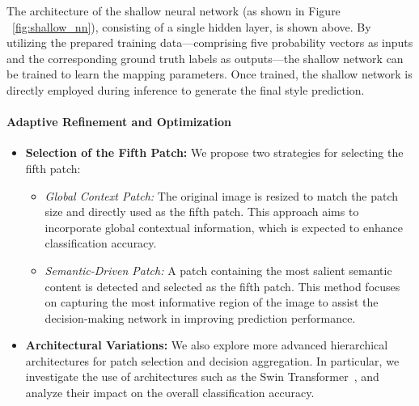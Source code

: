 The architecture of the shallow neural network (as shown in Figure ~\ref{fig:shallow_nn}), consisting of a single hidden
layer, is shown above. By utilizing the prepared training data—comprising five
probability vectors as inputs and the corresponding ground truth labels as
outputs—the shallow network can be trained to learn the mapping parameters.
Once trained, the shallow network is directly employed during inference to
generate the final style prediction.
\paragraph{Adaptive Refinement and Optimization}
\begin{itemize} \item \textbf{Selection of the Fifth Patch:}
          We propose two strategies for selecting the fifth patch: \begin{itemize} \item \textit{Global Context Patch:} The original image is resized to match the patch size and directly used as the fifth patch. This approach aims to incorporate global contextual information, which is expected to enhance classification accuracy. \item \textit{Semantic-Driven Patch:} A patch containing the most salient semantic content is detected and selected as the fifth patch. This method focuses on capturing the most informative region of the image to assist the decision-making network in improving prediction performance. \end{itemize} \item \textbf{Architectural Variations:}
          We also explore more advanced hierarchical architectures for patch selection and decision aggregation. In particular, we investigate the use of architectures such as the Swin Transformer~\cite{9718928}, and analyze their impact on the overall classification accuracy. \end{itemize}